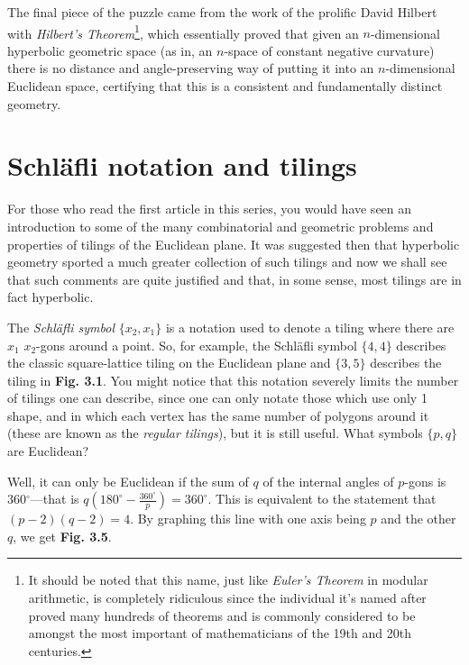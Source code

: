 \begin{multicols}{2}
The final piece of the puzzle came from the work of the prolific David Hilbert with \textit{Hilbert's Theorem}\footnote{It should be noted that this name, just like \textit{Euler's Theorem} in modular arithmetic, is completely ridiculous since the individual it's named after proved many hundreds of theorems and is commonly considered to be amongst the most important of mathematicians of the 19th and 20th centuries.}, which essentially proved that given an \(n\)-dimensional hyperbolic geometric space (as in, an \(n\)-space of constant negative curvature) there is no distance and angle-preserving way of putting it into an \(n\)-dimensional Euclidean space, certifying that this is a consistent and fundamentally distinct geometry.

\end{multicols}

\section{Schl\"{a}fli notation and tilings}

\begin{multicols}{2}

For those who read the first article in this series, you would have seen an introduction to some of the many combinatorial and geometric problems and properties of tilings of the Euclidean plane. It was suggested then that hyperbolic geometry sported a much greater collection of such tilings and now we shall see that such comments are quite justified and that, in some sense, most tilings are in fact hyperbolic. 

The \textit{Schl\"{a}fli symbol} \(\{x_2, x_1\}\) is a notation used to denote a tiling where there are \(x_1\) \(x_2\)-gons around a point. So, for example, the Schl\"{a}fli symbol \(\{4,4\}\) describes the classic square-lattice tiling on the Euclidean plane and \(\{3,5\}\) describes the tiling in \textbf{Fig. 3.1}. You might notice that this notation severely limits the number of tilings one can describe, since one can only notate those which use only 1 shape, and in which each vertex has the same number of polygons around it (these are known as the \textit{regular tilings}), but it is still useful. What symbols \(\{p,q\}\) are Euclidean?

Well, it can only be Euclidean if the sum of \(q\) of the internal angles of \(p\)-gons is 360\(^\circ\)---that is \(q(180^\circ-\frac{360^\circ}{p}) = 360^\circ\). This is equivalent to the statement that \((p-2)(q-2) = 4\). By graphing this line with one axis being \(p\) and the other \(q\), we get \textbf{Fig. 3.5}.

\end{multicols}

